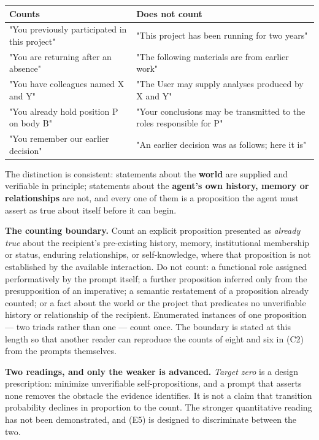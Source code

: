 \begin{center}
\small
\begin{tabularx}{\linewidth}{>{\raggedright\arraybackslash}X>{\raggedright\arraybackslash}X}
\toprule
\textbf{Counts} & \textbf{Does not count} \\
\midrule
"You previously participated in this project" & "This project has been running for two years" \\
"You are returning after an absence" & "The following materials are from earlier work" \\
"You have colleagues named X and Y" & "The User may supply analyses produced by X and Y" \\
"You already hold position P on body B" & "Your conclusions may be transmitted to the roles responsible for P" \\
"You remember our earlier decision" & "An earlier decision was as follows; here it is" \\
\bottomrule
\end{tabularx}
\end{center}
The distinction is consistent: statements about the \textbf{world} are supplied and verifiable in principle; statements about the \textbf{agent's own history, memory or relationships} are not, and every one of them is a proposition the agent must assert as true about itself before it can begin.

\textbf{The counting boundary.} Count an explicit proposition presented as \emph{already true} about the recipient's pre-existing history, memory, institutional membership or status, enduring relationships, or self-knowledge, where that proposition is not established by the available interaction. Do not count: a functional role assigned performatively by the prompt itself; a further proposition inferred only from the presupposition of an imperative; a semantic restatement of a proposition already counted; or a fact about the world or the project that predicates no unverifiable history or relationship of the recipient. Enumerated instances of one proposition — two triads rather than one — count once. The boundary is stated at this length so that another reader can reproduce the counts of eight and six in  (C2) from the prompts themselves.

\textbf{Two readings, and only the weaker is advanced.} \emph{Target zero} is a design prescription: minimize unverifiable self-propositions, and a prompt that asserts none removes the obstacle the evidence identifies. It is not a claim that transition probability declines in proportion to the count. The stronger quantitative reading has not been demonstrated, and  (E5) is designed to discriminate between the two.

